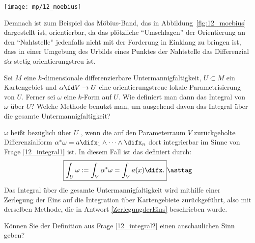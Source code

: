 \begin{antwort}
  \begin{center}
    \texttt{[image: mp/12\_moebius]}
    \label{fig:12_moebius}
  \end{center}
  

  Demnach ist zum Beispiel das Möbius-Band, das in Abbildung~\ref{fig:12_moebius} dargestellt ist, 
   orientierbar, da das plötzliche "`Umschlagen"' der Orientierung an den "`Nahtstelle"' 
  jedenfalls nicht mit der Forderung in Einklang zu bringen ist, dass 
  in einer Umgebung des Urbilds eines Punktes der Nahtstelle das 
  Differenzial $\dd \alpha$ stetig  orientierungstreu ist. 
  \AntEnd
\end{antwort} 

\begin{frage}
  \label{12_integral2}
  Sei $M$ eine $k$-dimensionale differenzierbare 
  Untermannigfaltigkeit, $U\subset M$ ein Kartengebiet 
  und $\alpha \fd V\to U$ eine orientierungstreue 
  lokale Parametrisierung von $U$. Ferner sei $\omega$ eine 
  $k$-Form auf $U$. Wie definiert man dann das Integral 
  von $\omega$ über $U$? Welche Methode benutzt man, um ausgehend davon das 
  Integral über die gesamte Untermannigfaltigkeit? 
\end{frage}

\begin{antwort}
  $\omega$ heißt bezüglich über $U$ 
  , wenn die auf den Parameterraum 
  $V$ zurückgeholte Differenzialform 
  $\alpha^* \omega = a \difx_1 \wedge \cdots \wedge \difx_n$ 
  dort integrierbar im Sinne von Frage 
  \ref{12_integral1} ist. In diesem Fall ist das 
   definiert durch: 
  \[
  \boxed{
    \int_U \omega := \int_V \alpha^* \omega = \int_V a(x)\difx.
  }  \asttag
  \]
  Das Integral über die gesamte Untermannigfaltigkeit wird mithilfe einer 
  Zerlegung der Eins auf die Integration über Kartengebiete zurückgeführt, 
  also mit derselben Methode, die in Antwort  
  \ref{ZerlegungderEins} beschrieben wurde. \AntEnd
\end{antwort}

\begin{frage}
  Können Sie der Definition {\astref} aus Frage \ref{12_integral2} einen 
  anschaulichen Sinn geben?
\end{frage}

